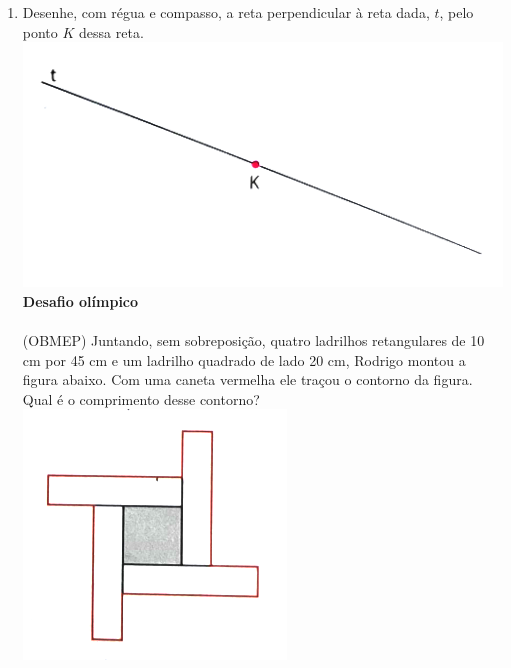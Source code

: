 \documentclass[a4paper,14pt]{article}
\begin{document}
\begin{multicols}{2}
\begin{enumerate}
   			\item Desenhe, com régua e compasso, a reta perpendicular à reta dada, $t$, pelo ponto $K$ dessa reta. \\
   			\includegraphics[width=1\linewidth]{6FMA70_imagens/imagem6} \\
   			\textbf{Desafio olímpico} \\\\
   			(OBMEP) Juntando, sem sobreposição, quatro ladrilhos retangulares de 10 cm por 45 cm e um ladrilho quadrado de lado 20 cm, Rodrigo montou a figura abaixo. Com uma caneta vermelha ele traçou o contorno da figura. Qual é o comprimento desse contorno? \\
   			\includegraphics[width=1\linewidth]{6FMA70_imagens/imagem7} \\

\end{enumerate}
\end{multicols}
\end{document}
